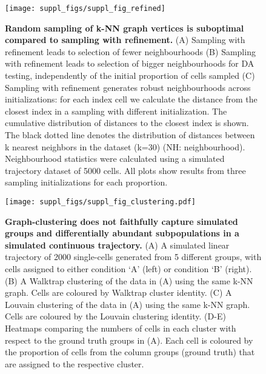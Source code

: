 \documentclass[
]{article}
\author{}
\date{\vspace{-2.5em}}
\begin{document}
\renewcommand{\figurename}{Supplementary Figure}

\newpage

\begin{figure}[ht]
\texttt{[image: suppl\_figs/suppl\_fig\_refined]} \caption{\textbf{Random sampling of k-NN graph vertices is suboptimal compared to sampling with refinement.}
(A) Sampling with refinement leads to selection of fewer neighbourhoods
(B) Sampling with refinement leads to selection of bigger neighbourhoods for DA testing, independently of the initial proportion of cells sampled
(C) Sampling with refinement generates robust neighbourhoods across initializations: for each index cell we calculate the distance from the closest index in a sampling with different initialization. The cumulative distribution of distances to the closest index is shown. The black dotted line denotes the distribution of distances between k nearest neighbors in the dataset (k=30) (NH: neighbourhood).
Neighbourhood statistics were calculated using a simulated trajectory dataset of 5000 cells. All plots show results from three sampling initializations for each proportion.}\label{fig:sup-fig-refined}
\end{figure}







\begin{figure}
\centering
\texttt{[image: suppl\_figs/suppl\_fig\_clustering.pdf]}
\caption{\label{fig:sup-fig-clustering}\textbf{Graph-clustering does not faithfully capture simulated groups and differentially abundant subpopulations in a simulated continuous trajectory.}
(A) A simulated linear trajectory of 2000 single-cells generated from 5 different groups, with cells assigned to either condition `A' (left) or condition `B' (right).
(B) A Walktrap clustering of the data in (A) using the same k-NN graph. Cells are coloured by Walktrap cluster identity.
(C) A Louvain clustering of the data in (A) using the same k-NN graph. Cells are coloured by the Louvain clustering identity.
(D-E) Heatmaps comparing the numbers of cells in each cluster with respect to the ground truth groups in (A). Each cell is coloured by the proportion of cells from the column groups (ground truth) that are assigned to the respective cluster.}
\end{figure}
\end{document}
